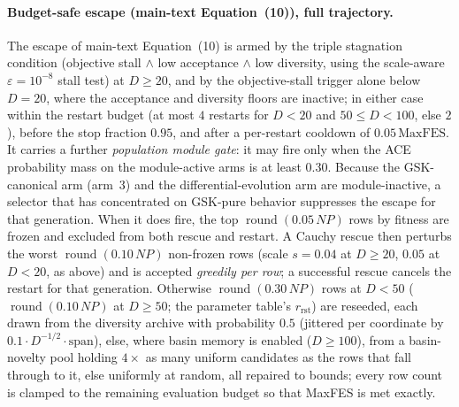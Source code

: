\documentclass[algorithms,article,submit,moreauthors,pdftex]{Definitions/mdpi}
\begin{document}
\paragraph{Budget-safe escape (main-text Equation~(10)), full trajectory.}
The escape of main-text Equation~(10) is armed by the triple stagnation condition
(objective stall $\wedge$ low acceptance $\wedge$ low diversity, using the
scale-aware $\varepsilon=10^{-8}$ stall test) at $D\ge 20$, and by the
objective-stall trigger alone below $D=20$, where the acceptance and diversity
floors are inactive; in either case within the restart budget (at most $4$
restarts for $D<20$ and $50\le D<100$, else $2$), before the stop fraction $0.95$, and
after a per-restart cooldown of $0.05\,\mathrm{MaxFES}$.  It carries a further
\emph{population module gate}: it may fire only when the ACE probability mass on the
module-active arms is at least $0.30$.  Because the GSK-canonical arm (arm~3) and the
differential-evolution arm are module-inactive, a selector that has concentrated on
GSK-pure behavior suppresses the escape for that generation.  When it does fire, the
top $\operatorname{round}(0.05\,NP)$ rows by fitness are frozen and excluded from both
rescue and restart.  A Cauchy rescue then perturbs the worst
$\operatorname{round}(0.10\,NP)$ non-frozen rows (scale $s=0.04$ at $D\ge 20$, $0.05$ at
$D<20$, as above) and is accepted \emph{greedily per row}; a successful rescue cancels
the restart for that generation.  Otherwise $\operatorname{round}(0.30\,NP)$ rows at
$D<50$ ($\operatorname{round}(0.10\,NP)$ at $D\ge 50$; the parameter table's
$r_{\text{rst}}$) are reseeded, each drawn from the diversity archive with
probability $0.5$ (jittered per coordinate by $0.1\cdot D^{-1/2}\cdot\mathrm{span}$),
else, where basin memory is enabled ($D\ge 100$), from a basin-novelty pool
holding $4\times$ as many uniform candidates as the rows that fall through to it,
else uniformly at random, all repaired to bounds; every row count is clamped to the
remaining evaluation budget so that MaxFES is met exactly.
\end{document}
